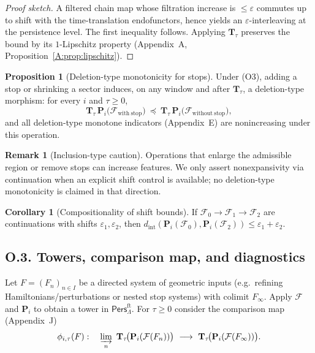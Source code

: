 \documentclass[11pt]{article}
\numberwithin{equation}{section}
\theoremstyle{plain}
\theoremstyle{definition}
\theoremstyle{remark}
\DeclareRobustCommand{\hyp}{\nobreakdash-}
\newcommand{\Pers}{\mathsf{Pers}}
\theoremstyle{plain}
\theoremstyle{definition}
\numberwithin{equation}{section}
\newtheorem{proposition}[theorem]{Proposition}
\newtheorem{corollary}[theorem]{Corollary}
\theoremstyle{definition}
\newtheorem{remark}[theorem]{Remark}
\numberwithin{equation}{section}
\theoremstyle{plain}
\theoremstyle{definition}
\theoremstyle{remark}
\begin{document}
\begin{proof}[Proof sketch]
A filtered chain map whose filtration increase is \(\le\varepsilon\) commutes up to shift with the time-translation endofunctors, hence yields an \(\varepsilon\)-interleaving at the persistence level. The first inequality follows. Applying \(\mathbf{T}_\tau\) preserves the bound by its \(1\)\hyp Lipschitz property (Appendix~A, Proposition~\ref{A:prop:lipschitz}).
\end{proof}

\begin{proposition}[Deletion-type monotonicity for stops]\label{O:prop:stops}
Under \textup{(O3)}, adding a stop or shrinking a sector induces, on any window and after \(\mathbf{T}_\tau\), a deletion-type morphism:
for every \(i\) and \(\tau\ge 0\),
\[
\mathbf{T}_\tau\,\mathbf{P}_i\big(\mathcal{F}_{\mathrm{with\ stop}}\big)\ \preceq\ \mathbf{T}_\tau\,\mathbf{P}_i\big(\mathcal{F}_{\mathrm{without\ stop}}\big),
\]
and all deletion-type monotone indicators (Appendix~E) are nonincreasing under this operation.
\end{proposition}

\begin{remark}[Inclusion-type caution]\label{O:rmk:inclusion}
Operations that enlarge the admissible region or remove stops can increase features. We only assert nonexpansivity via continuation when an explicit shift control is available; no deletion-type monotonicity is claimed in that direction.
\end{remark}

\begin{corollary}[Compositionality of shift bounds]\label{O:cor:compose}
If \(\mathcal{F}_0\to\mathcal{F}_1\to\mathcal{F}_2\) are continuations with shifts \(\varepsilon_1,\varepsilon_2\), then
\(d_{\mathrm{int}}(\mathbf{P}_i(\mathcal{F}_0),\mathbf{P}_i(\mathcal{F}_2))\le \varepsilon_1+\varepsilon_2\).
\end{corollary}

\subsection*{O.3. Towers, comparison map, and diagnostics}
Let \(F=(F_n)_{n\in I}\) be a directed system of geometric inputs (e.g.\ refining Hamiltonians/perturbations or nested stop systems) with colimit \(F_\infty\).
Apply \(\mathcal{F}\) and \(\mathbf{P}_i\) to obtain a tower in \(\Pers^{\mathrm{ft}}_\Lambda\).
For \(\tau\ge 0\) consider the comparison map (Appendix~J)
\[
\phi_{i,\tau}(F):\quad \varinjlim_n\ \mathbf{T}_\tau\!\big(\mathbf{P}_i(\mathcal{F}(F_n))\big)\ \longrightarrow\ \mathbf{T}_\tau\!\big(\mathbf{P}_i(\mathcal{F}(F_\infty))\big).
\]
\end{document}
